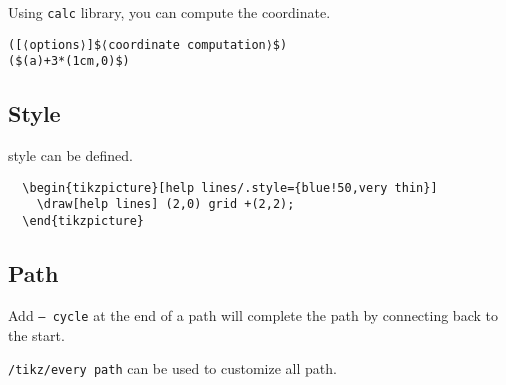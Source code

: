 Using \texttt{calc} library, you can compute the coordinate.
\begin{lstlisting}
([⟨options⟩]$⟨coordinate computation⟩$)
($(a)+3*(1cm,0)$)
\end{lstlisting}



\subsection{Style}
style can be defined.
\begin{lstlisting}
  \begin{tikzpicture}[help lines/.style={blue!50,very thin}]
    \draw[help lines] (2,0) grid +(2,2);
  \end{tikzpicture}
\end{lstlisting}

\subsection{Path}
Add \texttt{-- cycle} at the end of a path will complete the path by
connecting back to the start.

\texttt{/tikz/every path} can be used to customize all path.

